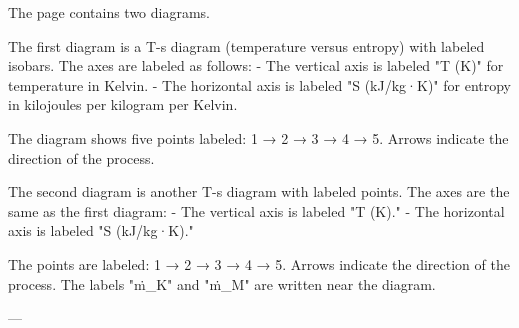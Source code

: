 The page contains two diagrams.  

The first diagram is a T-s diagram (temperature versus entropy) with labeled isobars. The axes are labeled as follows:  
- The vertical axis is labeled "T (K)" for temperature in Kelvin.  
- The horizontal axis is labeled "S (kJ/kg·K)" for entropy in kilojoules per kilogram per Kelvin.  

The diagram shows five points labeled:  
1 → 2 → 3 → 4 → 5.  
Arrows indicate the direction of the process.  

The second diagram is another T-s diagram with labeled points. The axes are the same as the first diagram:  
- The vertical axis is labeled "T (K)."  
- The horizontal axis is labeled "S (kJ/kg·K)."  

The points are labeled:  
1 → 2 → 3 → 4 → 5.  
Arrows indicate the direction of the process. The labels "ṁ_K" and "ṁ_M" are written near the diagram.  

---